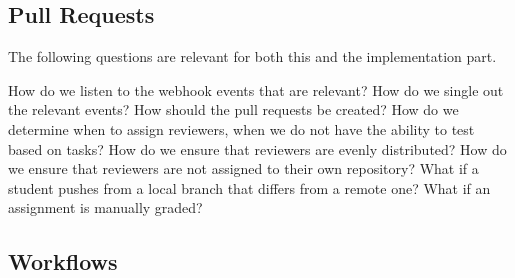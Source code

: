 \subsection{Pull Requests}

The following questions are relevant for both this and the implementation part.

How do we listen to the webhook events that are relevant?
How do we single out the relevant events?
How should the pull requests be created?
How do we determine when to assign reviewers, when we do not have the ability to test based on tasks?
How do we ensure that reviewers are evenly distributed?
How do we ensure that reviewers are not assigned to their own repository?
What if a student pushes from a local branch that differs from a remote one?
What if an assignment is manually graded?


\subsection{Workflows}
